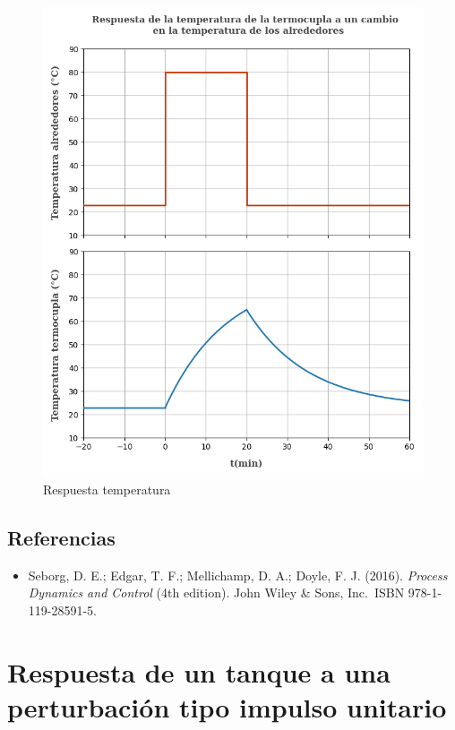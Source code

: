 \documentclass[
  letterpaper,
  DIV=11,
  numbers=noendperiod]{scrreprt}
\providecommand{\tightlist}{%
  \setlength{\itemsep}{0pt}\setlength{\parskip}{0pt}}\usepackage{longtable,booktabs,array}
\begin{document}
\begin{figure}

{\centering \includegraphics{././images/p5.5-seborg/p55sr.png}

}

\caption{Respuesta temperatura}

\end{figure}

\hypertarget{referencias-5}{%
\section{Referencias}\label{referencias-5}}

\begin{itemize}
\tightlist
\item
  Seborg, D. E.; Edgar, T. F.; Mellichamp, D. A.; Doyle, F. J. (2016).
  \emph{Process Dynamics and Control} (4th edition). John Wiley \& Sons,
  Inc.~ISBN 978-1-119-28591-5.
\end{itemize}

\hypertarget{respuesta-de-un-tanque-a-una-perturbaciuxf3n-tipo-impulso-unitario}{%
\chapter{Respuesta de un tanque a una perturbación tipo impulso
unitario}\label{respuesta-de-un-tanque-a-una-perturbaciuxf3n-tipo-impulso-unitario}}
\end{document}

